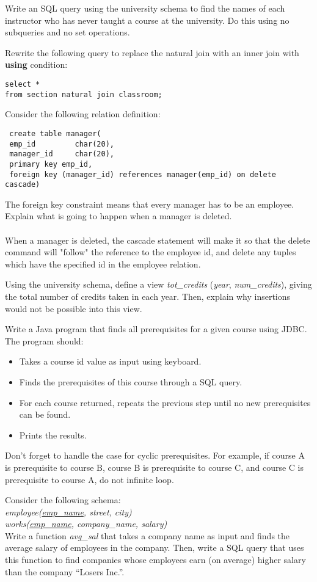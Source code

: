 \documentclass[a4 paper]{article}
\begin{document}
Write an SQL query using the university schema to find the names of each instructor who has never taught a course at the university. Do this using no subqueries and no set operations.


Rewrite the following query to replace the natural join with an inner join with \textbf{using} condition:
\begin{verbatim}
select *
from section natural join classroom;
\end{verbatim}



\color{black}

Consider the following relation definition:
\begin{verbatim}
 create table manager(
 emp_id         char(20),
 manager_id     char(20),
 primary key emp_id,
 foreign key (manager_id) references manager(emp_id) on delete cascade)
\end{verbatim}
The foreign key constraint means that every manager has to be an employee.
Explain what is going to happen when a manager is deleted.\\\\
When a manager is deleted, the cascade statement will make it so that the delete command will "follow" the reference to the employee id, and delete any tuples which have the specified id in the employee relation.



Using the university schema, define a view \emph{tot\_credits} (\emph{year}, \emph{num\_credits}), giving the total number of credits taken in each year. Then, explain why insertions would not be possible into this view.





Write a Java program that finds all prerequisites for a given course using JDBC. The program should:
\begin{itemize}
 \item Takes a course id value as input using keyboard.
 \item Finds the prerequisites of this course through a SQL query.
 \item For each course returned, repeats the previous step until no new prerequisites can be found.
 \item Prints the results.
\end{itemize}
Don't forget to handle the case for cyclic prerequisites. For example, if course A is prerequisite to course B, course B is prerequisite to course C, and course C is prerequisite to course A, do not infinite loop.


Consider the following schema:\\
\emph{employee(\underline{emp\_name}, street, city)}\\
\emph{works(\underline{emp\_name}, company\_name, salary)}\\
Write a function \emph{avg\_sal} that takes a company name as input and finds the average salary of employees in the company. Then, write a SQL query that uses this function to find companies whose employees earn (on average) higher salary than the company ``Losers Inc.''.
\end{document}
